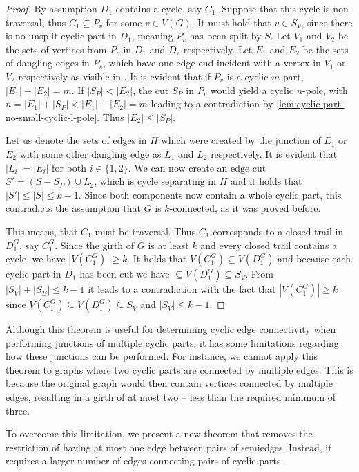 \documentclass[12pt, twoside]{book}
\begin{document}
\begin{proof}
	By assumption $D_1$ contains a cycle, say $C_1$. Suppose that this cycle is non-traversal, thus $C_1\subseteq P_v$ for some $v\in V(G)$. It must hold that $v\in S_V$, since there is no unsplit cyclic part in $D_1$, meaning $P_v$ has been split by $S$. Let $V_1$ and $V_2$ be the sets of vertices from $P_v$ in $D_1$ and $D_2$ respectively. Let $E_1$ and $E_2$ be the sets of dangling edges in $P_v$, which have one edge end incident with a vertex in $V_1$ or $V_2$ respectively as visible in . It is evident that if $P_v$ is a cyclic $m$-part, $|E_1|+|E_2|=m$. If $|S_P|<|E_2|$, the cut $S_P$ in $P_v$ would yield a cyclic $n$-pole, with $n=|E_1|+|S_P|<|E_1|+|E_2|=m$ leading to a contradiction by \cref{lem:cyclic-part-no-small-cyclic-l-pole}. Thus $|E_2|\leq |S_P|$.
	
	Let us denote the sets of edges in $H$ which were created by the junction of $E_1$ or $E_2$ with some other dangling edge as $L_1$ and $L_2$ respectively. It is evident that $|L_i|=|E_i|$ for both $i\in\{1,2\}$. We can now create an edge cut $S'=(S-S_P)\cup L_2$, which is cycle separating in $H$ and it holds that $|S'|\leq |S|\leq k-1$. Since both components now contain a whole cyclic part, this contradicts the assumption that $G$ is $k$-connected, as it was proved before.
	
	This means, that $C_1$ must be traversal. Thus $C_1$ corresponds to a closed trail in $D_1^G$, say $C_1^G$. Since the girth of $G$ is at least $k$ and every closed trail contains a cycle, we have $|V(C_1^G)|\geq k$. It holds that $V(C_1^G)\subseteq V(D_1^G)$ and because each cyclic part in $D_1$ has been cut we have $\subseteq V(D_1^G)\subseteq S_V$. From $|S_V|+|S_E|\leq k-1$ it leads to a contradiction with the fact that $|V(C_1^G)|\geq k$ since $V(C_1^G)\subseteq V(D_1^G)\subseteq S_V$ and $|S_V|\leq k-1$.
\end{proof}

Although this theorem is useful for determining cyclic edge connectivity when performing junctions of multiple cyclic parts, it has some limitations regarding how these junctions can be performed. For instance, we cannot apply this theorem to graphs where two cyclic parts are connected by multiple edges. This is because the original graph would then contain vertices connected by multiple edges, resulting in a girth of at most two -- less than the required minimum of three.

To overcome this limitation, we present a new theorem that removes the restriction of having at most one edge between pairs of semiedges. Instead, it requires a larger number of edges connecting pairs of cyclic parts.
\end{document}
